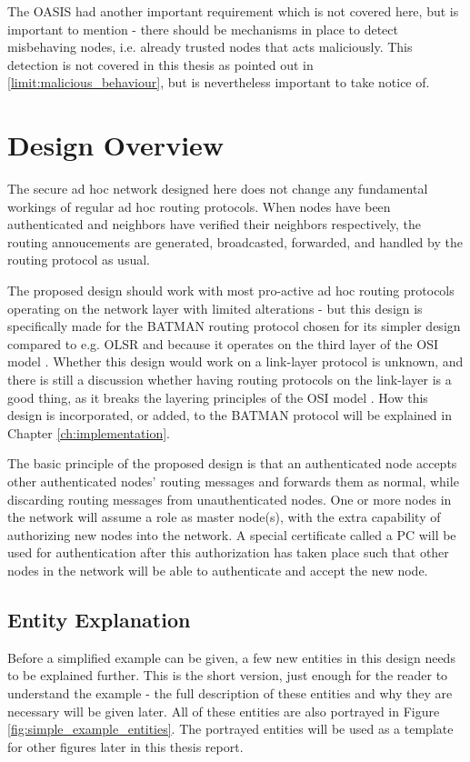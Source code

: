 The OASIS had another important requirement which is not covered here, but is
important to mention - there should be mechanisms in place to detect misbehaving
nodes, i.e. already trusted nodes that acts maliciously. This detection is not
covered in this thesis as pointed out in \ref{limit:malicious_behaviour}, but is
nevertheless important to take notice of.

\section{Design Overview}
The secure ad hoc network designed here does not change any fundamental workings
of regular ad hoc routing protocols. When nodes have been authenticated and
neighbors have verified their neighbors respectively, the routing annoucements
are generated, broadcasted, forwarded, and handled by the routing protocol as
usual.

The proposed design should work with most pro-active ad hoc routing protocols
operating on the network layer with limited alterations - but this design is
specifically made for the BATMAN \cite{batman_rfc} routing protocol chosen for
its simpler design compared to e.g. OLSR \cite{clausen2003rfc3626} and because
it operates on the third layer of the \ac{OSI} model \cite{zimmermann1980osi}.
Whether this design would work on a link-layer protocol is unknown, and there is
still a discussion whether having routing protocols on the link-layer is a good
thing, as it breaks the layering principles of the \ac{OSI} model
\cite{5680190}. How this design is incorporated, or added, to the BATMAN
protocol will be explained in Chapter \ref{ch:implementation}.

The basic principle of the proposed design is that an authenticated node accepts
other authenticated nodes' routing messages and forwards them as normal, while
discarding routing messages from unauthenticated nodes. One or more nodes in the
network will assume a role as master node(s), with the extra capability of
authorizing new nodes into the network. A special certificate called a \ac{PC}
\cite{rfc3820} will be used for authentication after this authorization has taken
place such that other nodes in the network will be able to authenticate and
accept the new node.

\subsection{Entity Explanation}
Before a simplified example can be given, a few new entities in this design
needs to be explained further. This is the short version, just enough for the
reader to understand the example - the full description of these entities
and why they are necessary will be given later. All of these entities are also
portrayed in Figure \ref{fig:simple_example_entities}. The portrayed entities
will be used as a template for other figures later in this thesis report.

